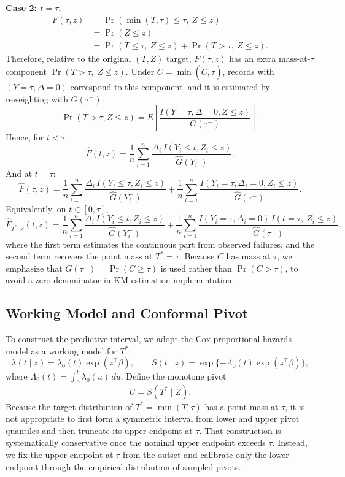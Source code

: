 \documentclass[12pt]{article}
\makeatletter
\let\thesis@section\subsection
\let\thesis@subsection\subsubsection
\renewcommand{\section}{\thesis@section}
\renewcommand{\subsection}{\thesis@subsection}
\makeatother
\begin{document}
\textbf{Case 2: $t=\tau$.}
\[
\begin{aligned}
F(\tau,z)
&=\Pr(\min(T,\tau)\le \tau,\ Z\le z) \\
&=\Pr(Z\le z) \\
&=\Pr(T\le \tau,\ Z\le z)+\Pr(T>\tau,\ Z\le z).
\end{aligned}
\]
Therefore, relative to the original $(T,Z)$ target, $F(\tau,z)$ has an extra
mass-at-$\tau$ component $\Pr(T>\tau,\ Z\le z)$.
Under $C=\min(\widetilde C,\tau)$, records with $(Y=\tau,\Delta=0)$ correspond to
this component, and it is estimated by reweighting with $G(\tau^-)$:
\[
\Pr(T>\tau,Z\le z)
=E\!\left[\frac{I(Y=\tau,\Delta=0,Z\le z)}{G(\tau^-)}\right].
\]
Hence, for $t<\tau$:
\[
\widehat F(t,z)
= \frac{1}{n} \sum_{i=1}^n
\frac{\Delta_i\, I(Y_i \le t, Z_i \le z)}{\widehat G(Y_i^-)}.
\]
And at $t=\tau$:
\[
\widehat F(\tau,z)
= \frac{1}{n} \sum_{i=1}^n
\frac{\Delta_i\, I(Y_i \le \tau, Z_i \le z)}{\widehat G(Y_i^-)}
+ \frac{1}{n} \sum_{i=1}^n
\frac{I(Y_i=\tau,\Delta_i=0,Z_i\le z)}{\widehat G(\tau^-)}.
\]
Equivalently, on $t\in[0,\tau]$,
\[
\widehat F_{T^*,Z}(t,z)
= \frac{1}{n} \sum_{i=1}^n
\frac{\Delta_i\, I(Y_i \le t, Z_i \le z)}{\widehat G(Y_i^-)}
+ \frac{1}{n} \sum_{i=1}^n
\frac{I(Y_i=\tau,\Delta_i=0)\,I(t=\tau,\ Z_i\le z)}{\widehat G(\tau^-)}.
\]
where the first term estimates the continuous part from observed failures, and the
second term recovers the point mass at $T^*=\tau$. Because $C$ has mass at $\tau$,
we emphasize that $G(\tau^-)=\Pr(C\ge\tau)$ is used rather than $\Pr(C>\tau)$, to avoid a zero denominator in KM estimation implementation.

\section{Working Model and Conformal Pivot}

To construct the predictive interval, we adopt the Cox proportional hazards model
as a working model for $T^*$:
\[
\lambda(t \mid z) = \lambda_0(t)\exp(z^\top\beta), \qquad
S(t \mid z) = \exp\{-\Lambda_0(t)\exp(z^\top\beta)\},
\]
where $\Lambda_0(t)=\int_0^t \lambda_0(u)\,du$.
Define the monotone pivot
\[
U = S(T^* \mid Z).
\]
Because the target distribution of $T^*=\min(T,\tau)$ has a point mass at $\tau$,
it is not appropriate to first form a symmetric interval from lower and upper pivot
quantiles and then truncate its upper endpoint at $\tau$. That construction is
systematically conservative once the nominal upper endpoint exceeds $\tau$. Instead,
we fix the upper endpoint at $\tau$ from the outset and calibrate only the lower
endpoint through the empirical distribution of sampled pivots.
\end{document}
